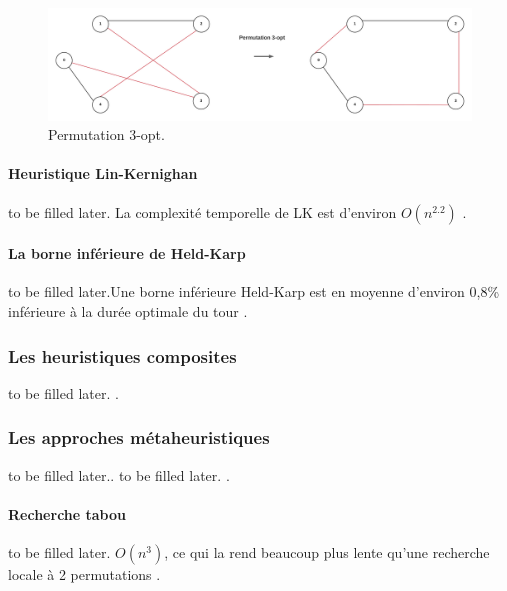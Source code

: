 \begin{figure}[hbt!]
  \centering
  \includegraphics[width=15cm]{images_pfe/THREE_OPT.png}
  \caption{Permutation 3-opt.}
  \label{fig:three-opt}
\end{figure}
\FloatBarrier


\medskip

\paragraph{Heuristique Lin-Kernighan}
\label{par:lin-kernighan}to be filled later. La complexité temporelle de LK est d'environ $O(n^{2.2})$ \parencite{helsgaun_effective_2000}.

\medskip

\paragraph{La borne inférieure de Held-Karp }
\label{held-karp}to be filled later.Une borne inférieure Held-Karp est en moyenne d'environ 0,8\% inférieure à la durée optimale du tour \parencite{johnson_asymptotic_1996}.

\medskip

\subsubsection{Les heuristiques composites}to be filled later. \parencite{golden_approximate_1980}.

\subsubsection{Les approches métaheuristiques}to be filled later.\parencite{blum_metaheuristics_2003}. to be filled later. \parencite{bianchi_survey_2009}.

\medskip

\paragraph{Recherche tabou}to be filled later. $O(n^3)$, ce qui la rend beaucoup plus lente qu'une recherche locale à 2 permutations \parencite{davendra_traveling_2010}.

